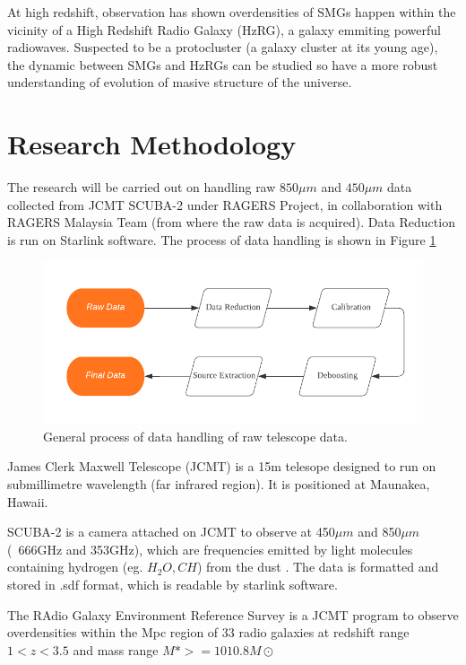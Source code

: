\documentclass{article}
\begin{document}
\noindent At high redshift, observation has shown overdensities of SMGs happen within the vicinity of a High Redshift Radio Galaxy (HzRG), a galaxy emmiting powerful radiowaves. Suspected to be a protocluster (a galaxy cluster at its young age), the dynamic between SMGs and HzRGs can be studied so have a more robust understanding of evolution of masive structure of the universe.\parencite{Saxena2018}

\section{Research Methodology}

The research will be carried out on handling raw $850\mu m$ and $450\mu m$ data collected from JCMT SCUBA-2 under RAGERS Project, in collaboration with RAGERS Malaysia Team (from where the raw data is acquired). Data Reduction is run on Starlink software. The process of data handling is shown in Figure \ref{fig:flowchart1}
\medskip

\begin{figure}
    \centering
    \includegraphics[width=150mm]{Flowchart.png}
    \caption{General process of data handling of raw telescope data.}
    \label{fig:flowchart1}
\end{figure}

\noindent James Clerk Maxwell Telescope (JCMT) is a 15m telesope designed to run on submillimetre wavelength (far infrared region). It is positioned at Maunakea, Hawaii. 
\medskip

\noindent SCUBA-2 is a camera attached on JCMT to observe at 450$\mu m$ and 850$\mu m$ (~666GHz and 353GHz), which are frequencies emitted by light molecules containing hydrogen (eg. $H_2O,CH$) from the dust \parencite{Phillips2013}. The data is formatted and stored in .sdf format, which is readable by starlink software.
\medskip

\noindent The RAdio Galaxy Environment Reference Survey is a JCMT program to observe overdensities within the Mpc region of 33 radio galaxies at redshift range $1 < z < 3.5$ and mass range $M\ast >=1010.8M\odot $ \parencite{ragers2021}
\medskip
\end{document}
